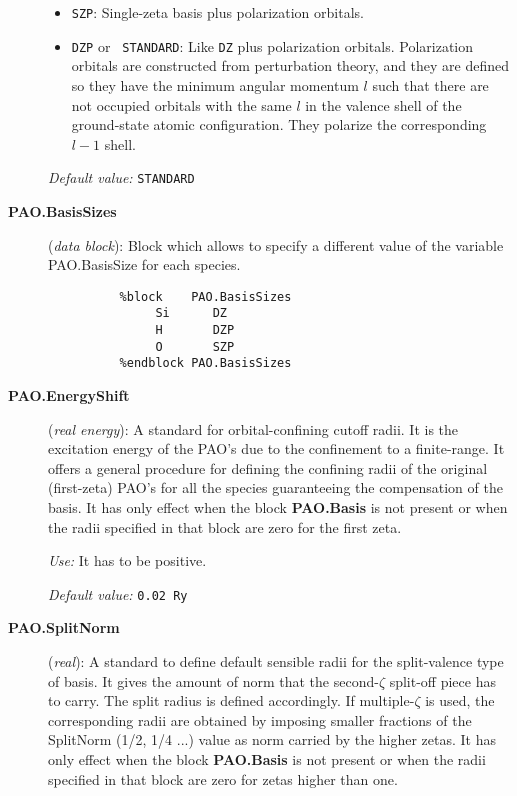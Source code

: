 \documentclass[11pt]{article}
\begin{document}
\begin{description}
\begin{itemize}
\item {\tt SZP}: Single-zeta basis plus polarization 
orbitals.

\item {\tt DZP} or {\tt
STANDARD}: Like {\tt DZ} plus
polarization orbitals.  Polarization orbitals are constructed from
perturbation theory, and they are
defined so they have the minimum angular
momentum $l$ such that there are not occupied orbitals with the same
$l$ in the valence shell of the ground-state atomic
configuration. They polarize the corresponding $l-1$ shell.
\end{itemize}

{\it Default value:} {\tt STANDARD}

\item[{\bf PAO.BasisSizes}]({\it data block}): 
Block which allows to specify a different value of the variable 
PAO.BasisSize for each species. 
\begin{verbatim}
          %block    PAO.BasisSizes
               Si      DZ
               H       DZP
               O       SZP 
          %endblock PAO.BasisSizes
\end{verbatim} 


\item[{\bf PAO.EnergyShift}] ({\it real energy}): A standard for 
orbital-confining cutoff radii. It is the excitation energy
of the PAO's due to the confinement to a finite-range. It offers a
general procedure for defining the confining radii of the original
(first-zeta) PAO's for all the species guaranteeing the compensation 
of the basis. It has only effect when the block
{\bf PAO.Basis} is not present or when the radii
specified in that block are zero for the first zeta.

{\it Use:} It has to be positive.

{\it Default value:} {\tt 0.02 Ry}


\item[{\bf PAO.SplitNorm}] ({\it real}): 
A standard to define default sensible
radii for the split-valence type of basis. It gives the amount of norm that
the second-$\zeta$ split-off piece has to carry. The split radius is defined
accordingly. If multiple-$\zeta$ 
is used, the corresponding radii are obtained
by imposing smaller fractions of the SplitNorm (1/2, 1/4 ...) value as
norm carried by the higher zetas. It has only effect when the block
{\bf PAO.Basis} is not present or when the radii
specified in that block are zero for zetas higher than one.


\end{description}
\end{document}
